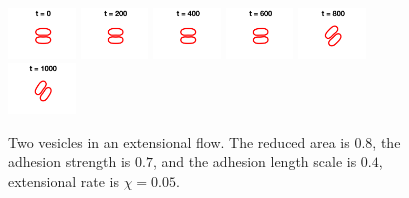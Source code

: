 \documentclass[%
preprint,
 amsmath,amssymb,
 aps,
]{revtex4-1}
\begin{document}
\begin{figure}[htp]
  \includegraphics[width = 0.16\textwidth]{figs/extensional_adR4em1adS7em1Chi5em2_ra080_image01.png}
  \includegraphics[width = 0.16\textwidth]{figs/extensional_adR4em1adS7em1Chi5em2_ra080_image02.png}
  \includegraphics[width = 0.16\textwidth]{figs/extensional_adR4em1adS7em1Chi5em2_ra080_image03.png}
  \includegraphics[width = 0.16\textwidth]{figs/extensional_adR4em1adS7em1Chi5em2_ra080_image04.png}
  \includegraphics[width = 0.16\textwidth]{figs/extensional_adR4em1adS7em1Chi5em2_ra080_image05.png}
  \includegraphics[width = 0.16\textwidth]{figs/extensional_adR4em1adS7em1Chi5em2_ra080_image06.png}
  \caption{\label{fig:extensional2} Two vesicles in an extensional flow.
  The reduced area is $0.8$, the adhesion strength is $0.7$, and the
  adhesion length scale is $0.4$, extensional rate is $\chi = 0.05$.}
\end{figure}
\end{document}
